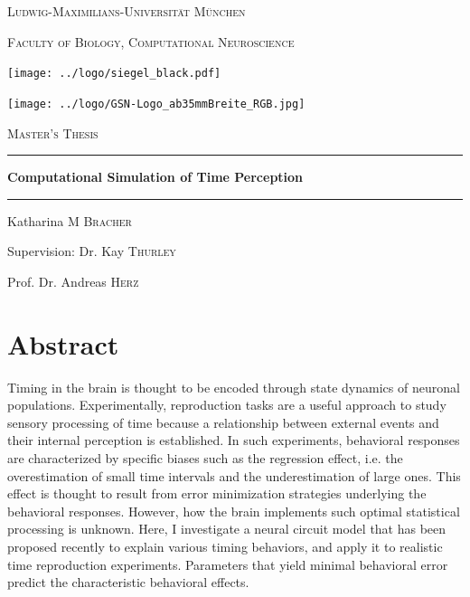 \documentclass[10pt, a4paper]{article}
\begin{document}



\begin{titlepage}
	\centering
	{\scshape\LARGE Ludwig-Maximilians-Universität München \par}
	{\scshape\large Faculty of Biology, Computational Neuroscience \par}
	\vspace{0.7cm}
	\texttt{[image: ../logo/siegel\_black.pdf]}\par
	\texttt{[image: ../logo/GSN-Logo\_ab35mmBreite\_RGB.jpg]}\par
	\vspace{0.5cm}

	{\scshape\LARGE Master's Thesis}
	\vspace{0.5cm}
	\rule{\textwidth}{1.pt}
	{\huge\bfseries Computational Simulation of Time Perception \par}
	\rule{\textwidth}{1.pt}
	\vspace{0.5cm}

	{\Large Katharina \textsc{M Bracher} \par}
	\vspace{1cm}

	{\large Supervision: Dr. Kay \textsc{Thurley} \par}
	{\large Prof. Dr. Andreas \textsc{Herz} \par}
\end{titlepage}

%
{}
\normalsize

\section*{Abstract}
Timing in the brain is thought to be encoded through state dynamics of neuronal populations.
Experimentally, reproduction tasks are a useful approach to study sensory processing of time because a relationship between external events and their internal perception is established.
In such experiments, behavioral responses are characterized by specific biases such as the regression effect, i.e. the overestimation of small time intervals and the underestimation of large ones.
This effect is thought to result from error minimization strategies underlying the behavioral responses.
However, how the brain implements such optimal statistical processing is unknown.
Here, I investigate a neural circuit model that has been proposed recently to explain various timing behaviors, and apply it to realistic time reproduction experiments.  
Parameters that yield minimal behavioral error predict the characteristic behavioral effects. 
\end{document}
